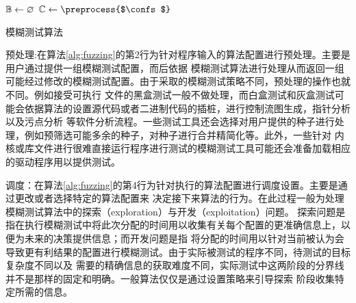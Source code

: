 \documentclass[bachelor]{njupthesis}
\begin{document}
\begin{algorithm}[H]
	\KwIn{\confs, \timeout}
	$\mathbb{B} \gets \varnothing$\;
	$\confs \gets \preprocess{$\confs$}$\;
	\Return{\bugs}\;
	\caption[short]{模糊测试算法}\label{alg:fuzzing} 
\end{algorithm} 
\vspace{6pt}
预处理:在算法\ref{alg:fuzzing}的第2行为针对程序输入的算法配置进行预处理。主要是用户通过提供一组模糊测试配置，而后依据
模糊测试算法进行处理从而返回一组可能经过修改的模糊测试配置。由于采取的模糊测试策略不同，预处理的操作也就不同。例如接受可执行
文件的黑盒测试一般不做处理，而白盒测试和灰盒测试可能会依据算法的设置源代码或者二进制代码的插桩，进行控制流图生成，指针分析以及污点分析
等软件分析流程。一些测试工具还会选择对用户提供的种子进行处理，例如预筛选可能多余的种子，对种子进行合并精简化等。此外，一些针对
内核或库文件进行很难直接运行程序进行测试的模糊测试工具可能还会准备加载相应的驱动程序用以提供测试。

调度：在算法\ref{alg:fuzzing}的第4行为针对执行的算法配置进行调度设置。主要是通过更改或者选择特定的算法配置来
决定接下来算法的行为。在此过程一般为处理模糊测试算法中的探索（exploration）与开发（exploitation）问题。
探索问题是指在执行模糊测试中将此次分配的时间用以收集有关每个配置的更准确信息上，以便为未来的决策提供信息；而开发问题是指
将分配的时间用以针对当前被认为会导致更有利结果的配置进行模糊测试。由于实际被测试的程序不同，待测试的目标复杂度不同以及
需要的精确信息的获取难度不同，实际测试中这两阶段的分界线并不是那样的固定和明确。一般算法仅仅是通过设置策略来引导探索
阶段收集特定所需的信息。
\end{document}
